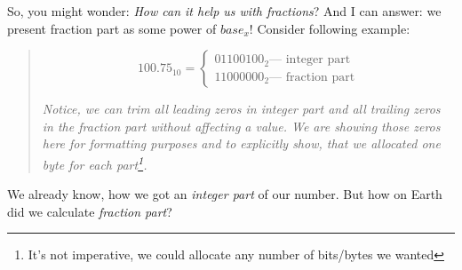 \documentclass{article}
\begin{document}
            So, you might wonder: \emph{How can it help us with fractions}? And I can answer: we present fraction part as some power of $base_x$! Consider following
            example:

            \begin{quote}
                \begin{equation*}
                    100.75_{10} = \begin{cases}
                            01100100_2 \text{--- integer part}\\
                            11000000_2 \text{--- fraction part}
                        \end{cases}
                    \end{equation*}

                    \emph{
                        Notice, we can trim all leading zeros in \emph{integer part} and all trailing zeros in the \emph{fraction part} without affecting a value.
                        We are showing those zeros here for formatting purposes and to explicitly show, that we allocated one byte for each part\footnote{It's not imperative,
                        we could allocate any number of bits/bytes we wanted}.
                    }
            \end{quote}
            
            We already know, how we got an \emph{integer part} of our number. But how on Earth did we calculate \emph{fraction part}?
\end{document}

